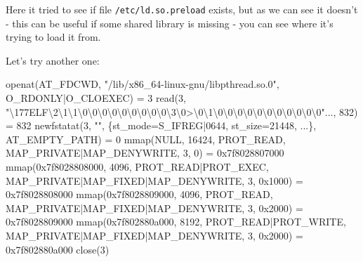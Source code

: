 \documentclass[
]{report}
\newenvironment{Shaded}{\begin{snugshade}}{\end{snugshade}}
\newcommand{\BuiltInTok}[1]{\textcolor[rgb]{0.00,0.23,0.31}{#1}}
\newcommand{\ErrorTok}[1]{\textcolor[rgb]{0.68,0.00,0.00}{#1}}
\newcommand{\ExtensionTok}[1]{\textcolor[rgb]{0.00,0.23,0.31}{#1}}
\newcommand{\KeywordTok}[1]{\textcolor[rgb]{0.00,0.23,0.31}{#1}}
\newcommand{\NormalTok}[1]{\textcolor[rgb]{0.00,0.23,0.31}{#1}}
\newcommand{\StringTok}[1]{\textcolor[rgb]{0.13,0.47,0.30}{#1}}
\begin{document}
Here it tried to see if file \texttt{/etc/ld.so.preload} exists, but as
we can see it doesn't - this can be useful if some shared library is
missing - you can see where it's trying to load it from.

Let's try another one:

\begin{Shaded}
\begin{Highlighting}[]
\ExtensionTok{openat}\ErrorTok{(}\ExtensionTok{AT\_FDCWD,} \StringTok{"/lib/x86\_64{-}linux{-}gnu/libpthread.so.0"}\NormalTok{, O\_RDONLY}\KeywordTok{|}\ExtensionTok{O\_CLOEXEC}\KeywordTok{)} \ExtensionTok{=}\NormalTok{ 3}
\BuiltInTok{read}\ErrorTok{(}\ExtensionTok{3,} \StringTok{"\textbackslash{}177ELF\textbackslash{}2\textbackslash{}1\textbackslash{}1\textbackslash{}0\textbackslash{}0\textbackslash{}0\textbackslash{}0\textbackslash{}0\textbackslash{}0\textbackslash{}0\textbackslash{}0\textbackslash{}0\textbackslash{}3\textbackslash{}0\textgreater{}\textbackslash{}0\textbackslash{}1\textbackslash{}0\textbackslash{}0\textbackslash{}0\textbackslash{}0\textbackslash{}0\textbackslash{}0\textbackslash{}0\textbackslash{}0\textbackslash{}0\textbackslash{}0\textbackslash{}0"}\NormalTok{..., 832}\KeywordTok{)} \ExtensionTok{=}\NormalTok{ 832}
\ExtensionTok{newfstatat}\ErrorTok{(}\ExtensionTok{3,} \StringTok{""}\NormalTok{, \{st\_mode=S\_IFREG}\KeywordTok{|}\ExtensionTok{0644,}\NormalTok{ st\_size=21448, ...\}, AT\_EMPTY\_PATH}\KeywordTok{)} \ExtensionTok{=}\NormalTok{ 0}
\ExtensionTok{mmap}\ErrorTok{(}\ExtensionTok{NULL,}\NormalTok{ 16424, PROT\_READ, MAP\_PRIVATE}\KeywordTok{|}\ExtensionTok{MAP\_DENYWRITE,}\NormalTok{ 3, 0}\KeywordTok{)} \ExtensionTok{=}\NormalTok{ 0x7f8028807000}
\ExtensionTok{mmap}\ErrorTok{(}\ExtensionTok{0x7f8028808000,}\NormalTok{ 4096, PROT\_READ}\KeywordTok{|}\ExtensionTok{PROT\_EXEC,}\NormalTok{ MAP\_PRIVATE}\KeywordTok{|}\ExtensionTok{MAP\_FIXED}\KeywordTok{|}\ExtensionTok{MAP\_DENYWRITE,}\NormalTok{ 3, 0x1000}\KeywordTok{)} \ExtensionTok{=}\NormalTok{ 0x7f8028808000}
\ExtensionTok{mmap}\ErrorTok{(}\ExtensionTok{0x7f8028809000,}\NormalTok{ 4096, PROT\_READ, MAP\_PRIVATE}\KeywordTok{|}\ExtensionTok{MAP\_FIXED}\KeywordTok{|}\ExtensionTok{MAP\_DENYWRITE,}\NormalTok{ 3, 0x2000}\KeywordTok{)} \ExtensionTok{=}\NormalTok{ 0x7f8028809000}
\ExtensionTok{mmap}\ErrorTok{(}\ExtensionTok{0x7f802880a000,}\NormalTok{ 8192, PROT\_READ}\KeywordTok{|}\ExtensionTok{PROT\_WRITE,}\NormalTok{ MAP\_PRIVATE}\KeywordTok{|}\ExtensionTok{MAP\_FIXED}\KeywordTok{|}\ExtensionTok{MAP\_DENYWRITE,}\NormalTok{ 3, 0x2000}\KeywordTok{)} \ExtensionTok{=}\NormalTok{ 0x7f802880a000}
\ExtensionTok{close}\ErrorTok{(}\ExtensionTok{3}\KeywordTok{)}
\end{Highlighting}
\end{Shaded}
\end{document}
